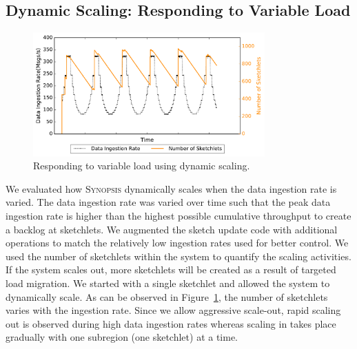 \subsection{Dynamic Scaling: Responding to Variable Load}
%
\begin{figure}[b!]
    \centerline{\includegraphics[width=3.5in]{figures/dyn-scaling.pdf}}
    \caption{Responding to variable load using dynamic scaling.}
    \label{fig:dyn-scaling}
\end{figure}
%
We evaluated how \textsc{Synopsis} dynamically scales when the data ingestion rate is varied.
The data ingestion rate was varied over time such that the peak data ingestion rate is higher than the highest possible cumulative throughput to create a backlog at sketchlets.
We augmented the sketch update code with additional operations to match the relatively low ingestion rates used for better control.
We used the number of sketchlets within the system to quantify the scaling activities.
If the system scales out, more sketchlets will be created as a result of targeted load migration.
We started with a single sketchlet and allowed the system to dynamically scale.
As can be observed in Figure~\ref{fig:dyn-scaling}, the number of sketchlets varies with the ingestion rate.
Since we allow aggressive scale-out, rapid scaling out is observed during high data ingestion rates whereas scaling in takes place gradually with one subregion (one sketchlet) at a time.

